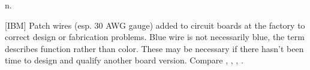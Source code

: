  n.

[IBM] Patch wires (esp. 30 AWG gauge) added to circuit boards at the factory to
correct design or fabrication problems. Blue wire is not necessarily blue, the
term describes function rather than color. These may be necessary if there
hasn't been time to design and qualify another board version. Compare
, , ,
.

